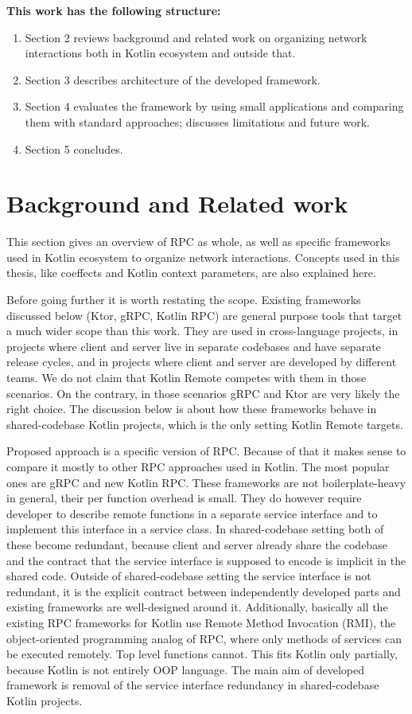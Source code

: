 \documentclass[a4paper,11pt,oneside]{article}
\begin{document}
\textbf{This work has the following structure:}
\begin{enumerate}
  \item Section 2 reviews background and related work on organizing network interactions both in Kotlin ecosystem and outside that.
  \item Section 3 describes architecture of the developed framework.
  \item Section 4 evaluates the framework by using small applications and comparing them with standard approaches; 
    discusses limitations and future work.
  \item Section 5 concludes.
\end{enumerate}

\section{Background and Related work}

This section gives an overview of RPC as whole, as well as specific frameworks used in Kotlin
ecosystem to organize network interactions. Concepts used in this thesis, like coeffects and Kotlin
context parameters, are also explained here.

Before going further it is worth restating the scope. Existing frameworks discussed below (Ktor,
gRPC, Kotlin RPC) are general purpose tools that target a much wider scope than this work. They
are used in cross-language projects, in projects where client and server live in separate
codebases and have separate release cycles, and in projects where client and server are developed
by different teams. We do not claim that Kotlin Remote competes with them in those scenarios. On
the contrary, in those scenarios gRPC and Ktor are very likely the right choice. The discussion
below is about how these frameworks behave in shared-codebase Kotlin projects, which is the only
setting Kotlin Remote targets.

Proposed approach is a specific version of RPC. Because of that it makes sense to compare it mostly
to other RPC approaches used in Kotlin. The most popular ones are gRPC and new Kotlin RPC. These
frameworks are not boilerplate-heavy in general, their per function overhead is small. They do
however require developer to describe remote functions in a separate service interface and to
implement this interface in a service class. In shared-codebase setting both of these become
redundant, because client and server already share the codebase and the contract that the service
interface is supposed to encode is implicit in the shared code. Outside of shared-codebase setting
the service interface is not redundant, it is the explicit contract between independently
developed parts and existing frameworks are well-designed around it. Additionally, basically all
the existing RPC frameworks for Kotlin use Remote Method Invocation (RMI), the object-oriented
programming analog of RPC, where only methods of services can be executed remotely. Top level
functions cannot. This fits Kotlin only partially, because Kotlin is not entirely OOP language.
The main aim of developed framework is removal of the service interface redundancy in
shared-codebase Kotlin projects.
\end{document}
